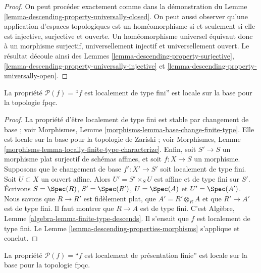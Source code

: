 \begin{proof}
On peut procéder exactement comme dans la démonstration du
Lemme \ref{lemma-descending-property-universally-closed}. On peut aussi
observer qu'une application d'espaces topologiques est un homéomorphisme si
et seulement si elle est injective, surjective et ouverte. Un homéomorphisme
universel équivaut donc à un morphisme surjectif, universellement injectif et
universellement ouvert. Le résultat découle ainsi des Lemmes
\ref{lemma-descending-property-surjective},
\ref{lemma-descending-property-universally-injective} et
\ref{lemma-descending-property-universally-open}.
\end{proof}

\begin{lemma}
\label{lemma-descending-property-locally-finite-type}
La propriété $\mathcal{P}(f) =$``$f$ est localement de type fini'' est locale
sur la base pour la topologie fpqc.
\end{lemma}

\begin{proof}
La propriété d'être localement de type fini est stable par changement de base ;
voir Morphismes, Lemme \ref{morphisms-lemma-base-change-finite-type}. Elle est
locale sur la base pour la topologie de Zariski ; voir Morphismes, Lemme
\ref{morphisms-lemma-locally-finite-type-characterize}. Enfin, soit
$S' \to S$ un morphisme plat surjectif de schémas affines, et soit
$f : X \to S$ un morphisme. Supposons que le changement de base
$f' : X' \to S'$ soit localement de type fini. Soit $U \subset X$ un ouvert
affine. Alors $U' = S' \times_S U$ est affine et de type fini sur $S'$.
Écrivons $S = \Spec(R)$, $S' = \Spec(R')$, $U = \Spec(A)$ et
$U' = \Spec(A')$. Nous savons que $R \to R'$ est fidèlement plat, que
$A' = R' \otimes_R A$ et que $R' \to A'$ est de type fini. Il faut montrer
que $R \to A$ est de type fini. C'est Algèbre, Lemme
\ref{algebra-lemma-finite-type-descends}. Il s'ensuit que $f$ est localement
de type fini. Le Lemme \ref{lemma-descending-properties-morphisms}
s'applique et conclut.
\end{proof}

\begin{lemma}
\label{lemma-descending-property-locally-finite-presentation}
La propriété $\mathcal{P}(f) =$``$f$ est localement de présentation finie''
est locale sur la base pour la topologie fpqc.
\end{lemma}

